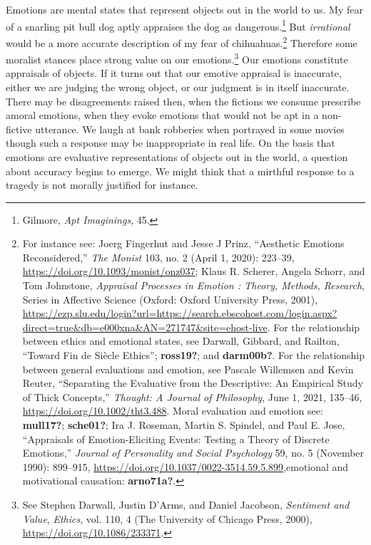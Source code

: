 \documentclass[
  12pt,
]{book}
\theoremstyle{definition}
\theoremstyle{definition}
\theoremstyle{definition}
\theoremstyle{definition}
\theoremstyle{remark}
\begin{document}
Emotions are mental states that represent objects out in the world to us. My fear of a snarling pit bull dog aptly appraises the dog as dangerous.\footnote{Gilmore, \emph{Apt {Imaginings}}, 45.} But \emph{irrational} would be a more accurate description of my fear of chihuahuas.\footnote{For instance see: Joerg Fingerhut and Jesse J Prinz, {``Aesthetic Emotions Reconsidered,''} \emph{The Monist} 103, no. 2 (April 1, 2020): 223--39, \url{https://doi.org/10.1093/monist/onz037}; Klaus R. Scherer, Angela Schorr, and Tom Johnstone, \emph{Appraisal {Processes} in {Emotion} : {Theory}, {Methods}, {Research}}, Series in {Affective Science} (Oxford: Oxford University Press, 2001), \url{https://ezp.slu.edu/login?url=https://search.ebscohost.com/login.aspx?direct=true&db=e000xna&AN=271747&site=ehost-live}. For the relationship between ethics and emotional states, see Darwall, Gibbard, and Railton, {``Toward Fin de Siècle Ethics''}; \textbf{ross19?}; and \textbf{darm00b?}. For the relationship between general evaluations and emotion, see Pascale Willemsen and Kevin Reuter, {``Separating the Evaluative from the Descriptive: {An} Empirical Study of Thick Concepts,''} \emph{Thought: A Journal of Philosophy}, June 1, 2021, 135--46, \url{https://doi.org/10.1002/tht3.488}. Moral evaluation and emotion see: \textbf{mull17?}; \textbf{sche01?}; Ira J. Roseman, Martin S. Spindel, and Paul E. Jose, {``Appraisals of Emotion-Eliciting Events: {Testing} a Theory of Discrete Emotions,''} \emph{Journal of Personality and Social Psychology} 59, no. 5 (November 1990): 899--915, \url{https://doi.org/10.1037/0022-3514.59.5.899},emotional and motivational causation: \textbf{arno71a?}.} Therefore some moralist stances place strong value on our emotions.\footnote{See Stephen Darwall, Justin D'Arms, and Daniel Jacobson, \emph{Sentiment and {Value}}, \emph{Ethics}, vol. 110, 4 (The University of Chicago Press, 2000), \url{https://doi.org/10.1086/233371}.} Our emotions constitute appraisals of objects. If it turns out that our emotive appraisal is inaccurate, either we are judging the wrong object, or our judgment is in itself inaccurate. There may be disagreements raised then, when the fictions we consume prescribe amoral emotions, when they evoke emotions that would not be apt in a non-fictive utterance. We laugh at bank robberies when portrayed in some movies though such a response may be inappropriate in real life. On the basis that emotions are evaluative representations of objects out in the world, a question about accuracy begins to emerge. We might think that a mirthful response to a tragedy is not morally justified for instance.
\end{document}

